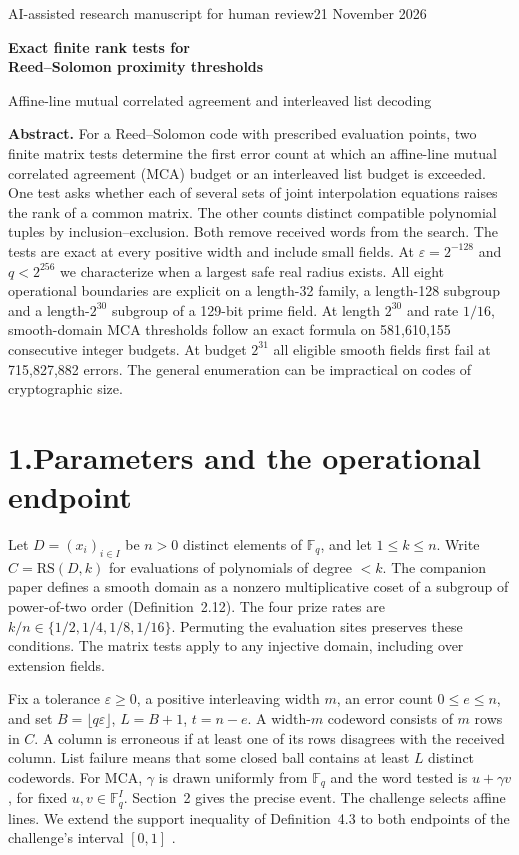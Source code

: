 \documentclass[11pt,letterpaper]{article}
\newcommand{\F}{\mathbb F_q}
\newcommand{\rs}{\mathrm{RS}}
\begin{document}
\thispagestyle{plain}
{\small\color{ink}\sffamily AI-assisted research manuscript for human review\hfill 21 November 2026}\par
\vspace{.6em}
{\LARGE\bfseries Exact finite rank tests for\\[2pt] Reed--Solomon proximity thresholds\par}
\vspace{.25em}
{\large Affine-line mutual correlated agreement and interleaved list decoding\par}
\vspace{.5em}
\textbf{Abstract.}
For a Reed--Solomon code with prescribed evaluation points, two finite matrix tests determine the first error count at which an affine-line mutual correlated agreement (MCA) budget or an interleaved list budget is exceeded. One test asks whether each of several sets of joint interpolation equations raises the rank of a common matrix. The other counts distinct compatible polynomial tuples by inclusion--exclusion. Both remove received words from the search. The tests are exact at every positive width and include small fields. At $\varepsilon=2^{-128}$ and $q<2^{256}$ we characterize when a largest safe real radius exists. All eight operational boundaries are explicit on a length-32 family, a length-128 subgroup and a length-$2^{30}$ subgroup of a 129-bit prime field. At length $2^{30}$ and rate $1/16$, smooth-domain MCA thresholds follow an exact formula on 581,610,155 consecutive integer budgets. At budget $2^{31}$ all eligible smooth fields first fail at 715,827,882 errors. The general enumeration can be impractical on codes of cryptographic size.

\section*{1.\quad Parameters and the operational endpoint}
Let $D=(x_i)_{i\in I}$ be $n>0$ distinct elements of $\F$, and let $1\le k\le n$. Write $C=\rs(D,k)$ for evaluations of polynomials of degree $<k$. The companion paper defines a smooth domain as a nonzero multiplicative coset of a subgroup of power-of-two order (Definition~2.12). The four prize rates are $k/n\in\{1/2,1/4,1/8,1/16\}$. Permuting the evaluation sites preserves these conditions. The matrix tests apply to any injective domain, including over extension fields.

Fix a tolerance $\varepsilon\ge0$, a positive interleaving width $m$, an error count $0\le e\le n$, and set $B=\lfloor q\varepsilon\rfloor$, $L=B+1$, $t=n-e$. A width-$m$ codeword consists of $m$ rows in $C$. A column is erroneous if at least one of its rows disagrees with the received column. List failure means that some closed ball contains at least $L$ distinct codewords. For MCA, $\gamma$ is drawn uniformly from $\F$ and the word tested is $u+\gamma v$, for fixed $u,v\in\F^I$. Section~2 gives the precise event. The challenge selects affine lines. We extend the support inequality of Definition~4.3 to both endpoints of the challenge's interval $[0,1]$ \cite{abf}.
\end{document}
